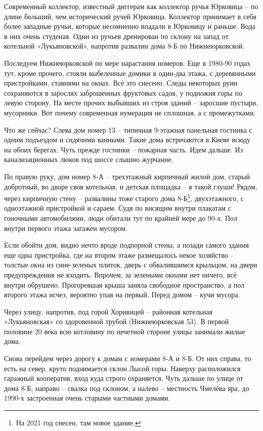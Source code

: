 Современный коллектор, известный диггерам как коллектор ручья Юрковица – по длине больший, чем исторический ручей Юрковица. Коллектор принимает в себя более западные ручьи, которые несомненно впадали в Юрковицу и раньше. Вода в них очень студеная. Один из ручьев дренирован по склону на запад от котельной «Лукьяновской», напротив развалин дома 8-Б по Нижнеюрковской.

Последуем Нижнеюрковской по мере нарастания номеров. Еще в 1980-90 годах тут, кроме прочего, стояли  выбеленные домики в один-два этажа, с деревянными пристройками, ставнями на окнах. Всё это снесено. Следы некоторых руин сохраняются в зарослях заброшенных фруктовых садов, у подножия горы по левую сторону. На месте прочих выбывших из строя зданий – заросшие пустыри, мусорники. Вот почему современная нумерация не сплошная, а с промежутками.

Что же сейчас? Слева дом номер 13 – типичная 9-этажная панельная гостинка с одним подъездом и сидячими ванными. Такие дома встречаются в Киеве всюду на обоих берегах. Чуть прежде гостинки – пожарная часть. Идем дальше. Из канализационных люков под шоссе слышно журчание.

По правую руку, дом номер 8-А – трехэтажный кирпичный жилой дом, старый добротный, во дворе своя котельная, и детская площадка – в такой глуши! Рядом, через кирпичную стену – развалины тоже старого дома 8-Б\footnote{На 2021 год снесен, там новое здание.}, двухэтажного, с одноэтажной пристройкой и сараем. Судя по висящим внутри плакатам с гоночными автомобилями, люди обитали тут по крайней мере до 90-х. Пол внутри первого этажа загажен мусором. 

Если обойти дом, видно нечто вроде подпорной стены, а позади самого здания еще одна пристройка, где на втором этаже размещалось некое хозяйство – толстые окна из сине-зеленых плиток, дверь с обвалившимся крыльцом, на двери предупреждения не входить. Впрочем, за зелеными окнами нет ничего, всё внутри обрушено. Прогоревшая крыша заняла свободное пространство, а пол второго этажа исчез, вероятно упав на первый. Перед домом – кучи мусора.

Через улицу, напротив, под горой Хоривицей – районная котельная «Лукьяновская» со здоровенной трубой (Нижнеюрковская 53). В первой половине 20 века всю котловину по нечетной стороне улицы занимали жилые дома.

Снова перейдем через дорогу к домам с номерами 8-А и 8-Б. От них справа, то есть на север, круто поднимается склон Лысой горы. Наверху расположился гаражный кооператив, вход куда строго охраняется. Чуть дальше по улице от дома 8-Б, направо – свалка под склоном, а налево – местность Чмелёва яра, до 1990-х застроенная очень старыми частными домами.

